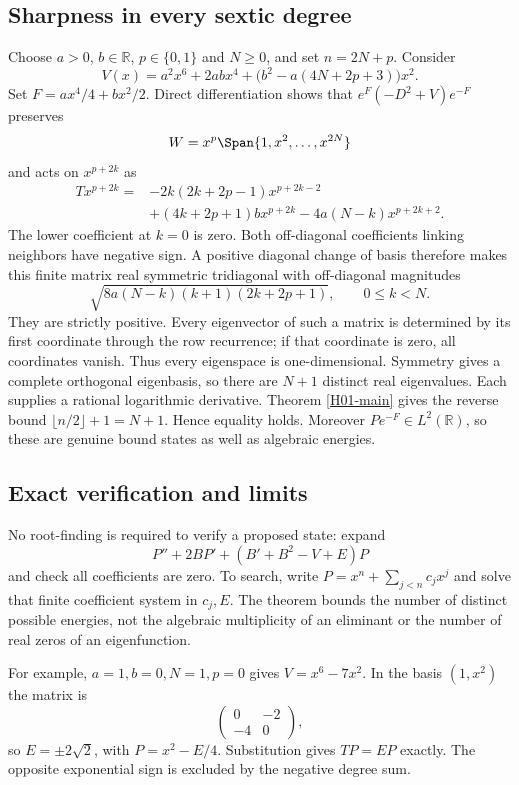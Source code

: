 \documentclass[11pt,a4paper]{article}
\theoremstyle{definition}\newtheorem{definition}[theorem]{Definition}
\theoremstyle{remark}\newtheorem{remark}[theorem]{Remark}
\newcommand{\R}{\mathbb R}\newcommand{\C}{\mathbb C}\newcommand{\N}{\mathbb N}
\numberwithin{equation}{section}
\begin{document}
\subsection{Sharpness in every sextic degree}\label{H01-sec-4}
Choose $a>0$, $b\in\R$, $p\in\{0,1\}$ and $N\ge0$, and set $n=2N+p$. Consider
\begin{equation}\label{H01-sextic}
V(x)=a^2x^6+2abx^4+\bigl(b^2-a(4N+2p+3)\bigr)x^2.
\end{equation}
Set $F=ax^4/4+bx^2/2$. Direct differentiation shows that $e^F(-D^2+V)e^{-F}$ preserves
\[W=x^p\Span\{1,x^2,\ldots,x^{2N}\}\]
and acts on $x^{p+2k}$ as
\begin{align*}
T x^{p+2k}={}&-2k(2k+2p-1)x^{p+2k-2}\\
&+(4k+2p+1)b x^{p+2k}-4a(N-k)x^{p+2k+2}.
\end{align*}
The lower coefficient at $k=0$ is zero. Both off-diagonal coefficients linking neighbors have negative sign. A positive diagonal change of basis therefore makes this finite matrix real symmetric tridiagonal with off-diagonal magnitudes
\[\sqrt{8a(N-k)(k+1)(2k+2p+1)},\qquad0\le k<N.\]
They are strictly positive. Every eigenvector of such a matrix is determined by its first coordinate through the row recurrence; if that coordinate is zero, all coordinates vanish. Thus every eigenspace is one-dimensional. Symmetry gives a complete orthogonal eigenbasis, so there are $N+1$ distinct real eigenvalues. Each supplies a rational logarithmic derivative. Theorem \ref{H01-main} gives the reverse bound $\lfloor n/2\rfloor+1=N+1$. Hence equality holds. Moreover $P e^{-F}\in L^2(\R)$, so these are genuine bound states as well as algebraic energies.
\subsection{Exact verification and limits}\label{H01-sec-5}
No root-finding is required to verify a proposed state: expand
\[P''+2BP'+(B'+B^2-V+E)P\]
and check all coefficients are zero. To search, write $P=x^n+\sum_{j<n}c_jx^j$ and solve that finite coefficient system in $c_j,E$. The theorem bounds the number of distinct possible energies, not the algebraic multiplicity of an eliminant or the number of real zeros of an eigenfunction.

For example, $a=1,b=0,N=1,p=0$ gives $V=x^6-7x^2$. In the basis $(1,x^2)$ the matrix is
\[\begin{pmatrix}0&-2\\-4&0\end{pmatrix},\]
so $E=\pm2\sqrt2$, with $P=x^2-E/4$. Substitution gives $TP=EP$ exactly. The opposite exponential sign is excluded by the negative degree sum.
\end{document}
